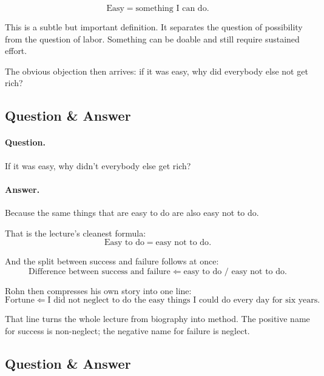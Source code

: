 \begin{equation}
\text{Easy}=\text{something I can do}.
\end{equation}

This is a subtle but important definition. It separates the question of possibility from the question of labor. Something can be doable and still require sustained effort.

The obvious objection then arrives: if it was easy, why did everybody else not get rich?

\subsection{Question \& Answer}

\paragraph{Question.} If it was easy, why didn't everybody else get rich?

\paragraph{Answer.} Because the same things that are easy to do are also easy not to do.

That is the lecture's cleanest formula:
\begin{equation}
\text{Easy to do}=\text{easy not to do}.
\end{equation}

And the split between success and failure follows at once:
\begin{equation}
\text{Difference between success and failure}
\Longleftarrow
\text{easy to do / easy not to do}.
\end{equation}

Rohn then compresses his own story into one line:
\begin{equation}
\text{Fortune}
\Longleftarrow
\text{I did not neglect to do the easy things I could do every day for six years}.
\end{equation}

That line turns the whole lecture from biography into method. The positive name for success is non-neglect; the negative name for failure is neglect.

\subsection{Question \& Answer}

